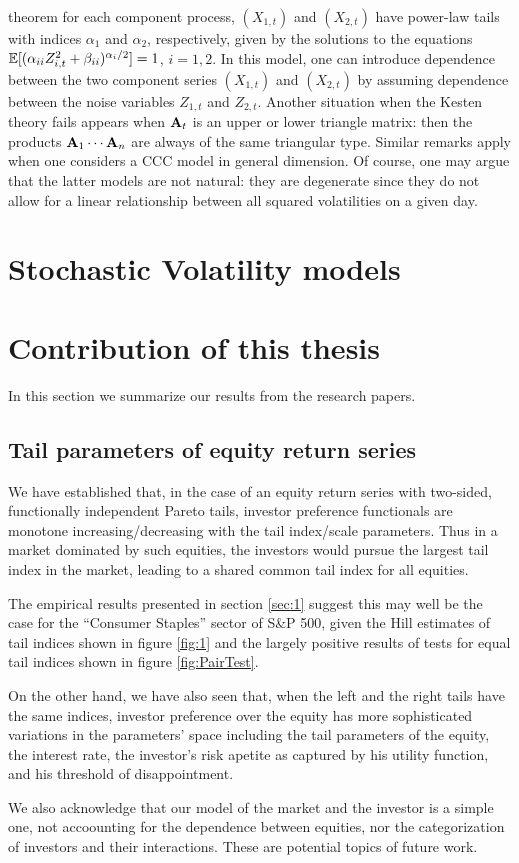 theorem for each component process, $(X_{1,t})$ and $(X_{2,t})$ have
power-law tails  with indices $\alpha_1$ and $\alpha_2$, respectively,
given by the solutions to the equations  $\mathbb{E} [(\alpha_{ii}
Z_{i,t}^2+\beta_{ii})^{\alpha_i/2}]=1$, $i=1,2$. In this model, one
can introduce dependence between the two component series $(X_{1,t})$
and $(X_{2,t})$ by assuming dependence between the noise variables
$Z_{1,t}$ and $Z_{2,t}$. Another situation when the Kesten theory fails 
appears when ${\mathbf A}_t$ is an upper or lower triangle matrix: then the
products  ${\mathbf A}_1\cdots{\mathbf A}_n$ are always of the same triangular
type. 
Similar remarks apply when one considers a CCC model in general
dimension. Of course, one may argue that the latter models 
are not natural: they are degenerate since they do not allow 
for a linear relationship between all squared volatilities on a given
day.

\section{Stochastic Volatility models}


\section{Contribution of this thesis}\label{sec:contr}

In this section we summarize our results from the research papers.

\subsection{Tail parameters of equity return series}
We have established that, in the case of an equity return series with
two-sided, functionally independent Pareto tails, investor
preference functionals are monotone increasing/decreasing with the
tail index/scale parameters. Thus in a market dominated by such
equities, the investors would pursue the largest tail index in the
market, leading to a shared common tail index for all equities.

The empirical results presented in section \ref{sec:1} suggest this
may well be the case for the ``Consumer Staples'' sector of S\&P 500,
given the Hill estimates of tail indices shown in figure \ref{fig:1}
and the largely positive results of tests for equal tail indices shown
in figure \ref{fig:PairTest}.

On the other hand, we have also seen that, when the left and the right
tails have the same indices, investor preference over the equity has
more sophisticated variations in the parameters' space including the
tail parameters of the equity, the interest rate, the investor's risk
apetite as captured by his utility function, and his threshold of
disappointment.

We also acknowledge that our model of the market and the investor is a
simple one, not accoounting for the dependence between equities, nor
the categorization of investors and their interactions. These are
potential topics of future work.

